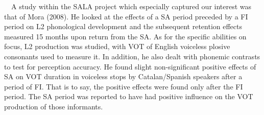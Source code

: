 \documentclass[11pt]{article}
\newenvironment{styleNormali}{\setlength\leftskip{0cm}\setlength\rightskip{0cm plus 1fil}\setlength\parindent{0cm}\setlength\parfillskip{0pt plus 1fil}\setlength\parskip{0cm plus 1pt}\writerlistparindent\writerlistleftskip\leavevmode\normalfont\normalsize\writerlistlabel\ignorespaces}{\unskip\vspace{0cm plus 1pt}\par}
\newcommand\writerlistleftskip{}
\newcommand\writerlistparindent{}
\newcommand\writerlistlabel{}
\begin{document}
\begin{styleNormali}
\ \ A study within the SALA project which especially captured our interest was that of Mora (2008). He looked at the effects of a SA period preceded by a FI period on L2 phonological development and the subsequent retention effects measured 15 months upon return from the SA. As for the specific abilities on focus, L2 production was studied, with VOT of English voiceless plosive consonants used to measure it. In addition, he also dealt with phonemic contrasts to test for perception accuracy. He found slight non-significant positive effects of SA on VOT duration in voiceless stops by Catalan/Spanish speakers after a period of FI. That is to say, the positive effects were found only after the FI period. The SA period was reported to have had positive influence on the VOT production of those informants. 
\end{styleNormali}
\end{document}
